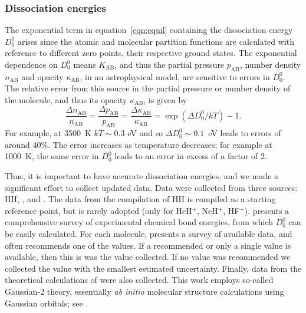 \documentclass[traditabstract]{aa} %
\begin{document}
\subsubsection{Dissociation energies}

The exponential term in equation~\ref{eqn:equil} containing the dissociation energy $D_0^0$ arises since the atomic and molecular partition functions are calculated with reference to different zero points, their respective ground states.  The exponential dependence on $D_0^0$ means $K_\mathrm{AB}$, and thus the partial pressure $p_\mathrm{AB}$, number density $n_\mathrm{AB}$ and opacity $\kappa_\mathrm{AB}$, in an astrophysical model, are sensitive to errors in $D_0^0$.  The relative error from this source in the partial pressure or number density of the molecule, and thus its opacity $\kappa_\mathrm{AB}$, is given by
\begin{equation}
\frac{\Delta n_\mathrm{AB}}{n_\mathrm{AB}} = \frac{\Delta p_\mathrm{AB}}{p_\mathrm{AB}} = \frac{\Delta \kappa_\mathrm{AB}}{\kappa_\mathrm{AB}} = \exp(\Delta D_0^0/kT) - 1. %
\end{equation}
For example, at 3500~K $kT\sim 0.3$ eV and so $\Delta D_0^0 \sim 0.1$~eV leads to errors of around 40\%.  The error increases as temperature decreases; for example at 1000~K, the same error in $D_0^0$ leads to an error in excess of a factor of 2.

Thus, it is important to have accurate dissociation energies, and we made a significant effort to collect updated data.   Data were collected from three sources: HH, \cite{Luo}, and  \cite{1991JChPh..94.7221C}.  The data from the compilation of HH is compiled as a starting reference point, but is rarely adopted (only for HeH$^+$, NeH$^+$, HF$^+$). \cite{Luo} presents a comprehensive survey of experimental chemical bond energies, from which $D_0^0$ can be easily calculated.  For each molecule, \cite{Luo} presents a survey of available data, and often recommends one of the values.  If a recommended or only a single value is available, then this is was the value collected.  If no value was recommended we collected the value with the smallest estimated uncertainty.  Finally, data from the theoretical calculations of \cite{1991JChPh..94.7221C} were also collected.  This work employs so-called Gaussian-2 theory, essentially \emph{ab initio} molecular structure calculations using Gaussian orbitals; see \cite{1991JChPh..94.7221C}.
\end{document}
